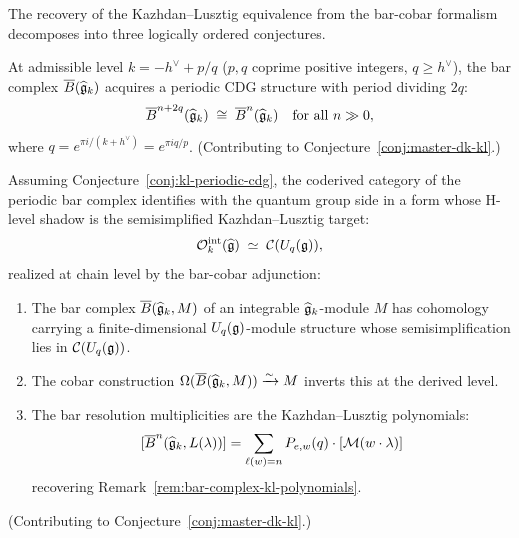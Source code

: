 \begin{remark}%
\label{rem:kl-programme}
The recovery of the Kazhdan--Lusztig equivalence from the bar-cobar
formalism decomposes into three logically ordered conjectures.
\end{remark}

\begin{conjecture}\label{conj:kl-periodic-cdg}
At admissible level $k = -h^\vee + p/q$ ($p, q$ coprime positive integers,
$q \geq h^\vee$), the bar complex $\overline{B}(\widehat{\mathfrak{g}}_k)$ acquires a
periodic CDG structure with period dividing $2q$:
\[
\overline{B}^{n+2q}(\widehat{\mathfrak{g}}_k) \;\cong\; \overline{B}^n(\widehat{\mathfrak{g}}_k)
\quad \text{for all } n \gg 0,
\]
where $q = e^{\pi i/(k+h^\vee)} = e^{\pi i q/p}$.
(Contributing to Conjecture~\ref{conj:master-dk-kl}.)
\end{conjecture}

\begin{conjecture}\label{conj:kl-coderived}
Assuming Conjecture~\textup{\ref{conj:kl-periodic-cdg}}, the
coderived category of the periodic bar complex identifies with the
quantum group side in a form whose H-level shadow is the
semisimplified Kazhdan--Lusztig target:
\begin{equation}\label{eq:kl-bar-cobar}
\mathcal{O}_k^{\mathrm{int}}(\widehat{\mathfrak{g}})
\;\simeq\;
\mathcal{C}(U_q(\mathfrak{g})),
\end{equation}
realized at chain level by the bar-cobar adjunction:
\begin{enumerate}[label=\textup{(\roman*)}]
\item The bar complex $\overline{B}(\widehat{\mathfrak{g}}_k, M)$ of an integrable
  $\widehat{\mathfrak{g}}_k$-module $M$ has cohomology carrying a finite-dimensional
  $U_q(\mathfrak{g})$-module structure whose semisimplification lies in
  $\mathcal{C}(U_q(\mathfrak{g}))$.
\item The cobar construction $\Omega(\overline{B}(\widehat{\mathfrak{g}}_k, M))
  \xrightarrow{\sim} M$ inverts this at the derived level.
\item The bar resolution multiplicities are the Kazhdan--Lusztig
  polynomials:
  \begin{equation}\label{eq:bar-kl-poly}
  [\overline{B}^n(\widehat{\mathfrak{g}}_k, L(\lambda))]
  = \sum_{\ell(w) = n} P_{e,w}(q) \cdot [\mathcal{M}(w \cdot \lambda)]
  \end{equation}
  recovering Remark~\textup{\ref{rem:bar-complex-kl-polynomials}}.
\end{enumerate}
(Contributing to Conjecture~\ref{conj:master-dk-kl}.)
\end{conjecture}

